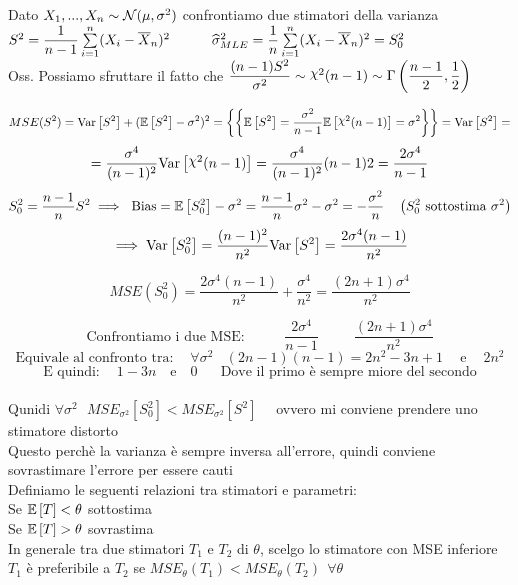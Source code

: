 Dato $X_1,...,X_n\sim\mathcal N(\mu,\sigma^2)$ confrontiamo due stimatori della varianza\\
$S^2=\dfrac{1}{n-1}\sum\limits_{i=1}^{n}(X_i-\overline{X}_n)^2 \hspace{30pt} \widehat{\sigma}^2_{MLE} = \dfrac{1}{n}\sum\limits_{i=1}^{n}(X_i-\overline{X}_n)^2=S_0^2$ \\
Oss. Possiamo sfruttare il fatto che $\frac{(n-1)S^2}{\sigma^2}\sim\Chi^2(n-1)\sim\Gamma\O\frac{n-1}{2},\frac{1}{2}\C$

\[MSE(S^2)=\var{S^2}+(\E{S^2}-\sigma^2)^2 =\OOO\OOO \E{S^2}=\frac{\sigma^2}{n-1}\E{\Chi^2(n-1)}=\sigma^2  \CCC\CCC= \var{S^2}= \]\[= \frac{\sigma^4}{(n-1)^2}\var{\Chi^2(n-1)}=\frac{\sigma^4}{(n-1)^2}(n-1)2=\frac{2\sigma^4}{n-1}\]
\[S_0^2=\frac{n-1}{n}S^2 \implies \ \text{Bias}=\E{S_0^2}-\sigma^2=\frac{n-1}{n}\sigma^2-\sigma^2=-\frac{\sigma^2}{n} \ \ \ \O S_0^2 \text{ sottostima }\sigma^2\C\]
\[ \implies \text{Var} \left[ S_0^2 \right]=\dfrac{(n-1)^2}{n^2}\text{Var} \left[ S^2 \right]=\dfrac{2\sigma^4(n-1)}{n^2}\]

\[MSE(S_0^2)=\frac{2\sigma^4(n-1)}{n^2}+\frac{\sigma^4}{n^2} = \frac{(2n+1)\sigma^4}{n^2}\]

\[\text{Confrontiamo i due MSE: } \hspace{30pt} \frac{2\sigma^4}{n-1} \hspace{30pt} \frac{(2n+1)\sigma^4}{n^2} \]
\[\text{Equivale al confronto tra: } \ \ \ \ \forall\sigma^2 \ \ \ \ (2n-1)(n-1)= 2n^2 -3n +1  \ \ \ \ \text{ e } \ \ \ \ 2n^2\]
\[\text{E quindi: } \ \ \ \ 1-3n \ \ \ \text{ e } \ \ \ 0  \ \ \ \
\ \ 
\text{ Dove il primo è sempre miore del secondo}\]\\
%
Qunidi $\forall \sigma^2 \ \ \ MSE_{\sigma^2}[S_0^2]<MSE_{\sigma^2}[S^2]$ \ \ ovvero mi conviene prendere uno stimatore distorto\\
Questo perchè la varianza è sempre inversa all'errore, quindi conviene sovrastimare l'errore per essere cauti\\

Definiamo le seguenti relazioni tra stimatori e parametri:\\
Se $\mathbb{E} \left[ T \right]<\theta$ sottostima\\
Se $\mathbb{E} \left[ T \right]>\theta$ sovrastima\\



In generale tra due stimatori $T_1$ e $T_2$ di $\theta$, scelgo lo stimatore con MSE inferiore\\
$T_1$ è preferibile a $T_2$ se $MSE_{\theta}(T_1)<MSE_{\theta}(T_2) \ \ \forall \theta$\\


